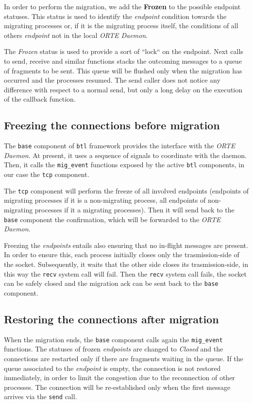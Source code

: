 In order to perform the migration, we add the \textbf{Frozen} to the
possible endpoint statuses. This status is used to identify the \emph{endpoint}
condition towards the migrating processes or, if it is the migrating process
itself, the conditions of all others \emph{endpoint} not in the local
\emph{ORTE Daemon}.

The \emph{Frozen} status is used to provide a sort of ``lock`` on the endpoint.
Next calls to send, receive and similar functions stacks the outcoming messages
to a queue of fragments to be sent. This queue will be flushed only when the
migration has occurred and the processes resumed. The send caller does not
notice any difference with respect to a normal send, but only a long delay on
the execution of the callback function.

\subsection{Freezing the connections before migration}
The \texttt{base} component of \texttt{btl} framework provides the interface
with the \emph{ORTE Daemon}. At present, it uses a sequence of signals to
coordinate with the daemon. Then, it calls the \texttt{mig\_event} functions
exposed by the active \texttt{btl} components, in our case the \texttt{tcp}
component.

The \texttt{tcp} component will perform the freeze of all involved endpoints
(endpoints of migrating processes if it is a non-migrating process, all
endpoints of non-migrating processes if it a migrating processes). Then it will 
send
back to the \texttt{base} component the confirmation, which will be forwarded
to the \emph{ORTE Daemon}.

Freezing the \emph{endpoints} entails also ensuring that no in-flight messages
are present. In order to ensure this, each process initially closes
only the trasmission-side of the socket. Subsequently, it waits that the other
side closes its trasmission-side, in this way the \texttt{recv} system call will
fail. Then the \texttt{recv} system call fails, the socket can be safely closed
and the migration ack can be sent back to the \texttt{base} component.

\subsection{Restoring the connections after migration}
When the migration ends, the \texttt{base} component calls again the
\texttt{mig\_event} functions. The statuses of frozen \emph{endpoints} are
changed to \emph{Closed} and the connections are restarted only if there are
fragments waiting in the queue. If the queue associated to the \emph{endpoint} is empty, the
connection is not restored immediately, in order to limit the congestion due
to the reconnection of other processes. The connection will be re-established
only when the first message arrives via the \texttt{send} call.

